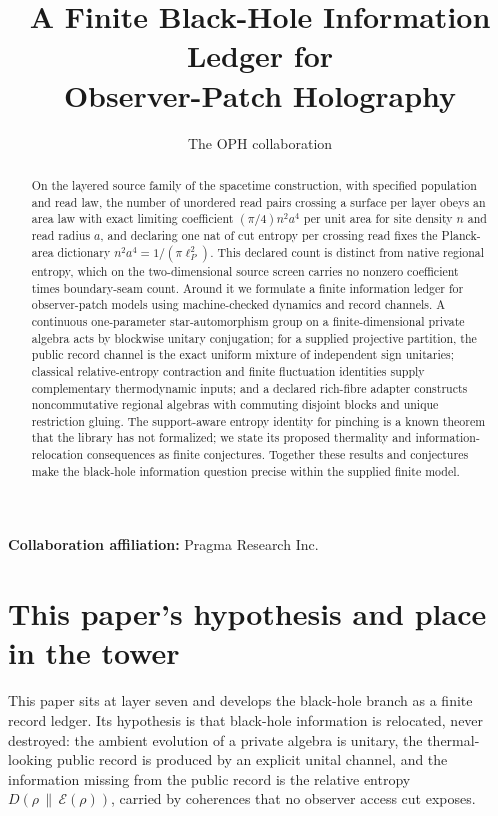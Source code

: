 \documentclass[11pt]{article}
\title{A Finite Black-Hole Information Ledger for\\
Observer-Patch Holography}
\author{The OPH collaboration}
\date{\OPHPaperReleaseDate}
\theoremstyle{remark}
\newcommand{\KL}[2]{D\!\left(#1\,\middle\|\,#2\right)}
\begin{document}
\maketitle
\OPHPaperReleaseBanner

\begin{center}
\small\textbf{Collaboration affiliation:} Pragma Research Inc.
\end{center}

\begin{abstract}
On the layered source family of the spacetime construction, with specified
population and read law, the number of unordered read pairs crossing a
surface per layer obeys an area law with exact limiting coefficient
\((\pi/4)n^2a^4\) per unit area for site density \(n\) and read radius
\(a\), and declaring one nat of cut entropy per crossing read fixes the
Planck-area dictionary \(n^2a^4=1/(\pi\ell_P^2)\). This declared count is
distinct from native regional entropy, which on the two-dimensional source
screen carries no nonzero coefficient times boundary-seam count. Around it
we formulate a finite information ledger for observer-patch models using
machine-checked dynamics and record channels. A continuous one-parameter
star-automorphism group on a finite-dimensional private algebra acts by
blockwise unitary conjugation; for a supplied projective partition, the
public record channel is the exact uniform mixture of independent sign
unitaries; classical relative-entropy contraction and finite fluctuation
identities supply complementary thermodynamic inputs; and a declared
rich-fibre adapter constructs noncommutative regional algebras with
commuting disjoint blocks and unique restriction gluing. The
support-aware entropy identity for pinching is a known theorem that the
library has not formalized; we state its proposed thermality and
information-relocation consequences as finite conjectures. Together these
results and conjectures make the black-hole information question precise
within the supplied finite model.
\end{abstract}



\section*{This paper's hypothesis and place in the tower}

This paper sits at layer seven and develops the black-hole branch as a
finite record ledger. Its hypothesis is that black-hole information is
relocated, never destroyed: the ambient evolution of a private algebra is
unitary, the thermal-looking public record is produced by an explicit unital
channel, and the information missing from the public record is the relative entropy \(\KL{\rho}{\mathcal E(\rho)}\), carried by
coherences that no observer access cut exposes.
\end{document}
